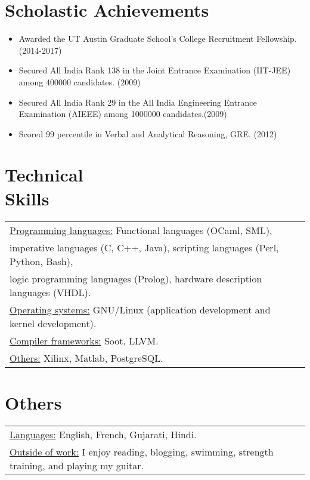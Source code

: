 \documentclass[margin]{res}
\begin{document}
\begin{resume}
\section{Scholastic Achievements}
 \begin{itemize} \itemsep -2pt  %
 \item Awarded the UT Austin Graduate School's College Recruitment
   Fellowship. \hfill (2014-2017)
 \item Secured All India Rank 138 in the Joint Entrance Examination
   (IIT-JEE) among 400000 candidates. \hfill (2009)
 \item Secured All India Rank 29 in the All India Engineering Entrance
   Examination (AIEEE) among 1000000 candidates.\hfill (2009)
 \item Scored 99 percentile in Verbal and Analytical Reasoning,
   GRE. \hfill (2012)
 \end{itemize}

\section{Technical \\ Skills}
   \begin{tabular}{l p{3in}}
    \underline{Programming languages:} Functional languages (OCaml,
    SML), \\imperative languages (C, C++, Java), scripting languages
    (Perl, Python, Bash), \\ logic programming languages (Prolog),
    hardware description languages (VHDL). \\

    \underline{Operating systems:} GNU/Linux (application development
    and kernel development). \\

    \underline{Compiler frameworks:} Soot, LLVM. \\

    \underline{Others:} Xilinx, Matlab, PostgreSQL. \\
 \end{tabular}

\section{Others}
\begin{tabular}{l p{3in}}
  \underline{Languages:} English, French, Gujarati, Hindi. \\
  \underline{Outside of work:} I enjoy reading, blogging, swimming,
  strength training, and playing my guitar.
\end{tabular}

\end{resume} 
\end{document}
